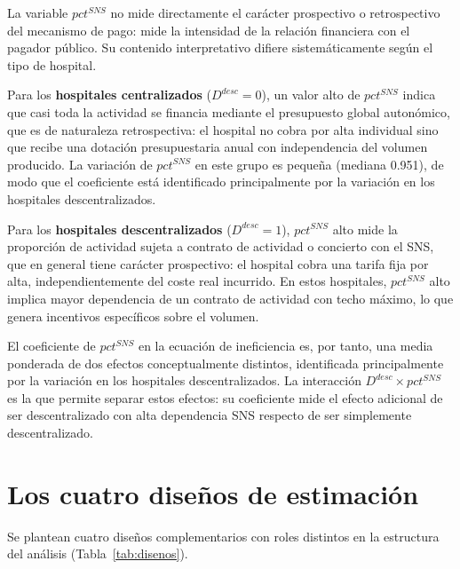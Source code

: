 \begin{remark}
\label{rem:pctsns_asimetria}
La variable $pct^{SNS}$ no mide directamente el carácter prospectivo o retrospectivo del mecanismo de pago: mide la intensidad de la relación financiera con el pagador público. Su contenido interpretativo difiere sistemáticamente según el tipo de hospital.

Para los \textbf{hospitales centralizados} ($D^{desc}=0$), un valor alto de $pct^{SNS}$ indica que casi toda la actividad se financia mediante el presupuesto global autonómico, que es de naturaleza retrospectiva: el hospital no cobra por alta individual sino que recibe una dotación presupuestaria anual con independencia del volumen producido. La variación de $pct^{SNS}$ en este grupo es pequeña (mediana 0.951), de modo que el coeficiente está identificado principalmente por la variación en los hospitales descentralizados.

Para los \textbf{hospitales descentralizados} ($D^{desc}=1$), $pct^{SNS}$ alto mide la proporción de actividad sujeta a contrato de actividad o concierto con el SNS, que en general tiene carácter prospectivo: el hospital cobra una tarifa fija por alta, independientemente del coste real incurrido. En estos hospitales, $pct^{SNS}$ alto implica mayor dependencia de un contrato de actividad con techo máximo, lo que genera incentivos específicos sobre el volumen.

El coeficiente de $pct^{SNS}$ en la ecuación de ineficiencia es, por tanto, una media ponderada de dos efectos conceptualmente distintos, identificada principalmente por la variación en los hospitales descentralizados. La interacción $D^{desc}\times pct^{SNS}$ es la que permite separar estos efectos: su coeficiente mide el efecto adicional de ser descentralizado con alta dependencia SNS respecto de ser simplemente descentralizado.
\end{remark}

\section{Los cuatro diseños de estimación}

Se plantean cuatro diseños complementarios con roles distintos en la estructura del análisis (Tabla~\ref{tab:disenos}).

